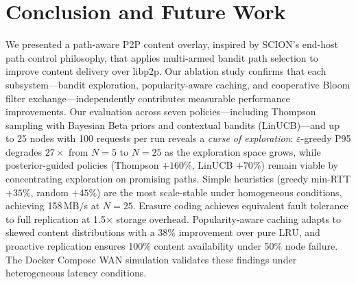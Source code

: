 \documentclass[sigconf,nonacm]{acmart}
\begin{document}
\section{Conclusion and Future Work}
\label{sec:conclusion}

We presented a path-aware P2P content overlay, inspired by SCION's end-host path control philosophy, that applies multi-armed bandit path selection to improve content delivery over libp2p. Our ablation study confirms that each subsystem---bandit exploration, popularity-aware caching, and cooperative Bloom filter exchange---independently contributes measurable performance improvements. Our evaluation across seven policies---including Thompson sampling with Bayesian Beta priors and contextual bandits (LinUCB)---and up to 25 nodes with 100 requests per run reveals a \emph{curse of exploration}: $\varepsilon$-greedy P95 degrades $27{\times}$ from $N{=}5$ to $N{=}25$ as the exploration space grows, while posterior-guided policies (Thompson $+160\%$, LinUCB $+70\%$) remain viable by concentrating exploration on promising paths. Simple heuristics (greedy min-RTT $+35\%$, random $+45\%$) are the most scale-stable under homogeneous conditions, achieving 158\,MB/s at $N{=}25$. Erasure coding achieves equivalent fault tolerance to full replication at 1.5$\times$ storage overhead. Popularity-aware caching adapts to skewed content distributions with a 38\% improvement over pure LRU, and proactive replication ensures 100\% content availability under 50\% node failure. The Docker Compose WAN simulation validates these findings under heterogeneous latency conditions.
\end{document}
